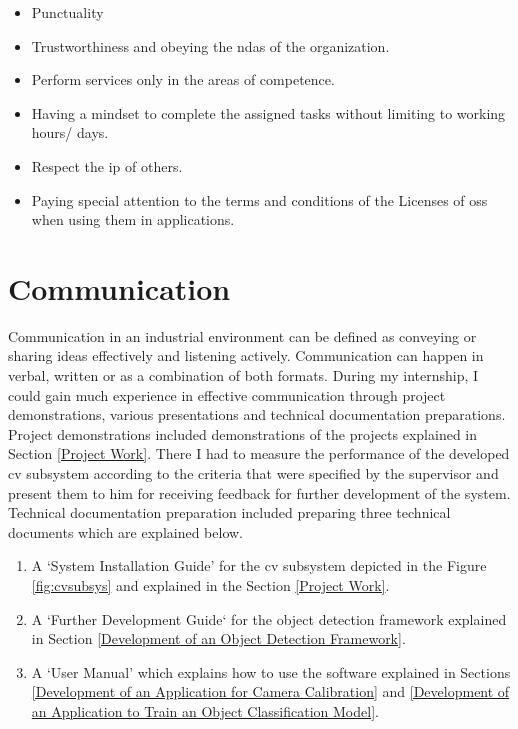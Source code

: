 \documentclass[a4paper,12pt]{report}%
\begin{document}
\begin{itemize}
	\item Punctuality
	\item Trustworthiness and obeying the \ac{nda}s of the organization.
	\item Perform services only in the areas of competence.
	\item Having a mindset to complete the assigned tasks without limiting to working hours/ days.
	\item Respect the \ac{ip} of others.
	\item Paying special attention to the terms and conditions of the  Licenses of \ac{oss} when using them in applications.
\end{itemize}

\section{Communication}
Communication in an industrial environment can be defined as conveying or sharing ideas effectively and listening actively. Communication can happen in verbal, written or as a combination of both formats. During my internship, I could gain much experience in effective communication through project demonstrations, various presentations and technical documentation preparations.\\

Project demonstrations included demonstrations of the projects explained in Section \ref{Project Work}. There I had to measure the performance of the developed \ac{cv} subsystem according to the criteria that were specified by the supervisor and present them to him for receiving feedback for further development of the system. Technical documentation preparation included preparing three technical documents which are explained below.

\begin{enumerate}
	\item A `System Installation Guide' for the \ac{cv} subsystem depicted in the Figure \ref{fig:cvsubsys} and explained in the Section \ref{Project Work}. 
	
	\item A `Further Development Guide` for the object detection framework explained in Section \ref{Development of an Object Detection Framework}.
	
	\item A `User Manual' which explains how to use the software explained in Sections \ref{Development of an Application for Camera Calibration} and \ref{Development of an Application to Train an Object Classification Model}.
\end{enumerate}
\end{document}
